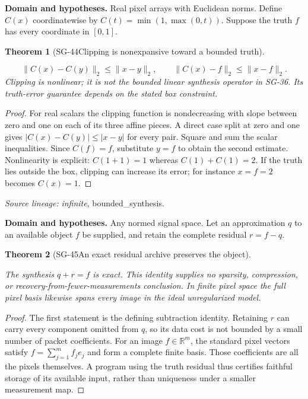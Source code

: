 \documentclass[11pt]{article}
\newtheorem{theorem}{Theorem}[section]
\theoremstyle{definition}\newtheorem{definition}[theorem]{Definition}
\theoremstyle{remark}\newtheorem{remark}[theorem]{Remark}
\begin{document}
\par{\small\textbf{Domain and hypotheses.} Real pixel arrays with Euclidean norms. Define $C(x)$ coordinatewise by $C(t)=\min(1,\max(0,t))$. Suppose the truth $f$ has every coordinate in $[0,1]$.}\par
\begin{theorem}[SG-44\quad Clipping is nonexpansive toward a bounded truth]\label{SG-44}

\[
 \|C(x)-C(y)\|_2\le\|x-y\|_2,\qquad
 \|C(x)-f\|_2\le\|x-f\|_2.
\]
Clipping is nonlinear; it is not the bounded linear synthesis operator in
SG-36. Its truth-error guarantee depends on the stated box constraint.

\end{theorem}
\begin{proof}

For real scalars the clipping function is nondecreasing with slope between
zero and one on each of its three affine pieces. A direct case split at zero
and one gives $|C(x)-C(y)|\le|x-y|$ for every pair.
Square and sum the scalar inequalities. Since $C(f)=f$, substitute $y=f$ to
obtain the second estimate. Nonlinearity is explicit: $C(1+1)=1$ whereas
$C(1)+C(1)=2$. If the truth lies outside the box, clipping can increase its
error; for instance $x=f=2$ becomes $C(x)=1$.

\end{proof}

\par{\small\color{Teal}\textit{Source lineage:} \textit{infinite}, bounded\_synthesis.}\par

\par{\small\textbf{Domain and hypotheses.} Any normed signal space. Let an approximation $q$ to an available object $f$ be supplied, and retain the complete residual $r=f-q$.}\par
\begin{theorem}[SG-45\quad An exact residual archive preserves the object]\label{SG-45}

The synthesis $q+r=f$ is exact. This identity supplies no sparsity, compression,
or recovery-from-fewer-measurements conclusion. In finite pixel space the
full pixel basis likewise spans every image in the ideal unregularized model.

\end{theorem}
\begin{proof}

The first statement is the defining subtraction identity. Retaining $r$
can carry every component omitted from $q$, so its data cost is not bounded by
a small number of packet coefficients. For an image $f\in\mathbb R^m$, the
standard pixel vectors satisfy $f=\sum_{j=1}^mf_je_j$ and form a complete
finite basis. Those coefficients are all the pixels themselves.
A program using the truth residual thus certifies faithful storage of its
available input, rather than uniqueness under a smaller measurement map.

\end{proof}
\end{document}
